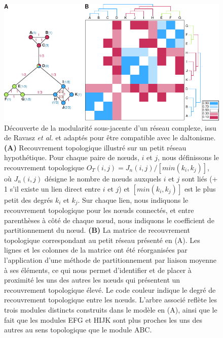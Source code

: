 \begin{figure}[ht]
    \centering
    \includegraphics{img/intro/3_coexpr/intro_3_coexpr_ravasz_topological_overlap.pdf}
    \caption[Découverte de la modularité sous-jacente d'un réseau complexe]{Découverte de la modularité sous-jacente d'un réseau complexe, issu de Ravasz \textit{et al.} \cite{Ravasz2002} et adaptés pour être compatible avec le daltonisme. \textbf{(A)} Recouvrement topologique illustré sur un petit réseau hypothétique. Pour chaque paire de nœuds, $i$ et $j$, nous définissons le recouvrement topologique $O_T(i, j) = J_n(i, j)/[min (k_i,k_j)]$, où $J_n(i, j)$ désigne le nombre de nœuds auxquels $i$ et $j$ sont liés (+ 1 s'il existe un lien direct entre $i$ et $j$) et $[min (k_i,k_j)]$ est le plus petit des degrés $k_i$ et $k_j$. Sur chaque lien, nous indiquons le recouvrement topologique pour les nœuds connectés, et entre parenthèses à côté de chaque nœud, nous indiquons le coefficient de partitionnement du nœud. \textbf{(B)} La matrice de recouvrement topologique correspondant au petit réseau présenté en (A). Les lignes et les colonnes de la matrice ont été réorganisées par l'application d'une méthode de partitionnement par liaison moyenne \cite{Eisen1998Dec} à ses éléments, ce qui nous permet d'identifier et de placer à proximité les uns des autres les nœuds qui présentent un recouvrement topologique élevé. Le code couleur indique le degré de recouvrement topologique entre les nœuds. L'arbre associé reflète les trois modules distincts construits dans le modèle en (A), ainsi que le fait que les modules EFG et HIJK sont plus proches les uns des autres au sens topologique que le module ABC.}
    \label{fig:topological_overlap_schema}
\end{figure}

